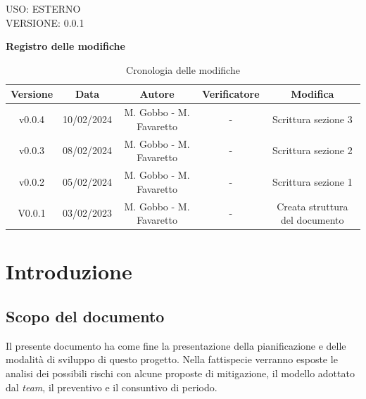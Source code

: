 \documentclass[5pt]{article}
\begin{document}
\begin{flushright}
    \begin{spacing}{1}
        USO: ESTERNO\\
        VERSIONE: 0.0.1\\
    \end{spacing}
\end{flushright}


\restoregeometry

\pagebreak

\textbf{\Large Registro delle modifiche}
\begin{table}[ht]
\centering
\begin{tabular}{|c|c|c|c|c|}
\hline
\textbf{Versione} & \textbf{Data} & \textbf{Autore} & \textbf{Verificatore} & \textbf{Modifica} \\
\hline
v0.0.4 & 10/02/2024 & M. Gobbo - M. Favaretto & - & Scrittura sezione 3 \\
\hline
v0.0.3 & 08/02/2024 & M. Gobbo - M. Favaretto & - & Scrittura sezione 2 \\
\hline
v0.0.2 & 05/02/2024 & M. Gobbo - M. Favaretto & - & Scrittura sezione 1 \\
\hline
V0.0.1 & 03/02/2023 & M. Gobbo - M. Favaretto & - & Creata struttura del documento \\
\hline
\end{tabular}
\caption{Cronologia delle modifiche}
\label{tab:conference}
\end{table}

\pagebreak
\tableofcontents
\pagebreak

\section{Introduzione}
\subsection{Scopo del documento}
Il presente documento ha come fine la presentazione della pianificazione e delle modalità di sviluppo di questo progetto. 
Nella fattispecie verranno esposte le analisi dei possibili rischi con alcune proposte di mitigazione, il modello adottato dal \textit{team}, 
il preventivo e il consuntivo di periodo.
\end{document}
